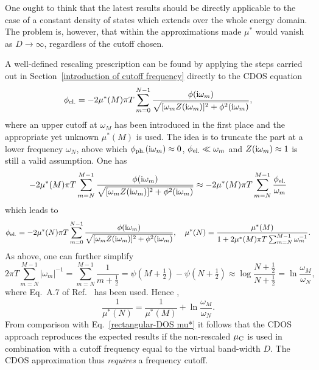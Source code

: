 One ought to think that the latest results should be directly applicable to the
case of a constant density of states which extends over the whole energy domain.
The problem is, however, that within the approximations made $\mu^*$ would
vanish as $D \rightarrow \infty$, regardless of the cutoff chosen.

A well-defined rescaling prescription can be found by applying the steps carried
out in Section~\ref{introduction of cutoff frequency} directly to the CDOS
 equation
%
\begin{equation} \label{approximate constant Coulomb contribution}
    \phi \sb{\text{el.}} = -2 \mu^*(M) \pi T \sum_{m = 0}^{N - 1}
    \frac
        {\phi(\mathrm i \omega_m)}
        {\sqrt{[\omega_m Z(\mathrm i \omega_m)]^2 + \phi^2(\mathrm i \omega_m)}},
\end{equation}
%
where an upper cutoff at $\omega_M$ has been introduced in the first place and
the appropriate yet unknown $\mu^*(M)$ is used. The idea is to truncate the
 part at a lower frequency $\omega_N$, above which $\phi \sb{\text{ph.}}
(\mathrm i \omega_m) \approx 0$, $\phi \sb{\text{el.}} \ll \omega_m$ and $Z(\mathrm i \omega_m)
\approx 1$ is still a valid assumption. One has
%
\begin{equation*}
    -2 \mu^*(M) \pi T \sum_{m = N}^{M - 1}
    \frac
        {\phi(\mathrm i \omega_m)}
        {\sqrt{[\omega_m Z(\mathrm i \omega_m)]^2 + \phi^2(\mathrm i \omega_m)}}
    \approx -2 \mu^*(M) \pi T \sum_{m = N}^{M - 1}
    \frac{\phi \sb{\text{el.}}}{\omega_m}
\end{equation*}
%
which leads to
%
\begin{equation*}
    \phi \sb{\text{el.}} = -2 \mu^*(N) \pi T \sum_{m = 0}^{N - 1}
    \frac
        {\phi(\mathrm i \omega_m)}
        {\sqrt{[\omega_m Z(\mathrm i \omega_m)]^2 + \phi^2(\mathrm i \omega_m)}},
    \quad
    \mu^*(N) = \frac{\mu^*(M)}{1 + 2 \mu^*(M) \pi T
    \sum_{m = N}^{M - 1} \omega_m^{-1}}.
\end{equation*}
%
As above, one can further simplify
%
\begin{equation*}
    2 \pi T \sum_{m = N}^{M - 1} |\omega_m|^{-1}
    = \sum_{m = N}^{M - 1} \frac 1 {m + \frac 1 2}
    = \psi(M + \tfrac 1 2) - \psi(N + \tfrac 1 2)
    \approx \log \frac{N + \frac 1 2}{N + \frac 1 2}
    = \ln \frac{\omega_M}{\omega_N},
\end{equation*}
%
where Eq.~A.7 of Ref.~ has been used. Hence
\cite[Eq.~9.14]{AllenMitrovic82},
%
\begin{equation*}
    \frac 1 {\mu^*(N)} = \frac 1 {\mu^*(M)} + \ln \frac{\omega_M}{\omega_N}.
\end{equation*}
%
From comparison with Eq.~\ref{rectangular-DOS mu*} it follows that the CDOS
approach reproduces the expected results if the non-rescaled $\mu \sb{\text{C}}$ is
used in combination with a cutoff frequency equal to the virtual band-width $D$.
The CDOS approximation thus \emph{requires} a frequency cutoff.

